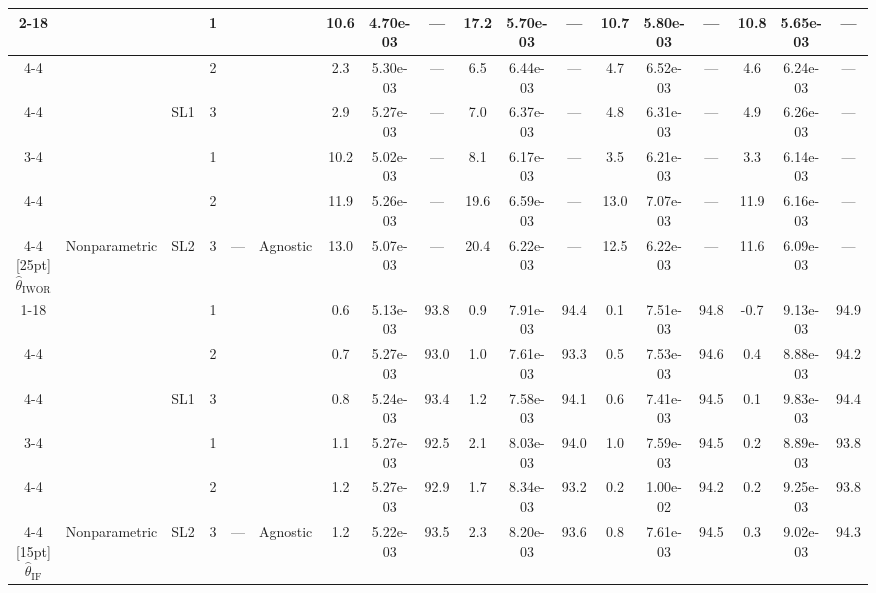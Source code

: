 \begin{table}
\begin{tabular}[t]{ccccccc@{}c@{}cc@{}c@{}cc@{}c@{}cc@{}c@{}c}
\cmidrule{2-18}
 &  &  &  1 &  &  & 10.6 & 4.70e-03 & --- & 17.2 & 5.70e-03 & --- & 10.7 & 5.80e-03 & --- & 10.8 & 5.65e-03 & ---\\
\cmidrule{4-4}
\cmidrule{7-18}
 &  &  &  2 &  &  & 2.3 & 5.30e-03 & --- & 6.5 & 6.44e-03 & --- & 4.7 & 6.52e-03 & --- & 4.6 & 6.24e-03 & ---\\
\cmidrule{4-4}
\cmidrule{7-18}
 &  & \multirow{-3}{*}[5pt]{\centering\arraybackslash SL1} &  3 &  &  & 2.9 & 5.27e-03 & --- & 7.0 & 6.37e-03 & --- & 4.8 & 6.31e-03 & --- & 4.9 & 6.26e-03 & ---\\
\cmidrule{3-4}
\cmidrule{7-18}
 &  &  &  1 &  &  & 10.2 & 5.02e-03 & --- & 8.1 & 6.17e-03 & --- & 3.5 & 6.21e-03 & --- & 3.3 & 6.14e-03 & ---\\
\cmidrule{4-4}
\cmidrule{7-18}
 &  &  &  2 &  &  & 11.9 & 5.26e-03 & --- & 19.6 & 6.59e-03 & --- & 13.0 & 7.07e-03 & --- & 11.9 & 6.16e-03 & ---\\
\cmidrule{4-4}
\cmidrule{7-18}
\multirow{-9}{*}[25pt]{\centering\arraybackslash $\widehat\theta_\text{IWOR}$} & \multirow{-6}{*}[15pt]{\centering\arraybackslash  Nonparametric} & \multirow{-3}{*}[5pt]{\centering\arraybackslash SL2} &  3 & \multirow{-6}{*}[15pt]{\centering\arraybackslash  ---} & \multirow{-6}{*}[15pt]{\centering\arraybackslash  Agnostic} & 13.0 & 5.07e-03 & --- & 20.4 & 6.22e-03 & --- & 12.5 & 6.22e-03 & --- & 11.6 & 6.09e-03 & ---\\
\cmidrule{1-18}
 &  &  &  1 &  &  & 0.6 & 5.13e-03 & 93.8 & 0.9 & 7.91e-03 & 94.4 & 0.1 & 7.51e-03 & 94.8 & -0.7 & 9.13e-03 & 94.9\\
\cmidrule{4-4}
\cmidrule{7-18}
 &  &  &  2 &  &  & 0.7 & 5.27e-03 & 93.0 & 1.0 & 7.61e-03 & 93.3 & 0.5 & 7.53e-03 & 94.6 & 0.4 & 8.88e-03 & 94.2\\
\cmidrule{4-4}
\cmidrule{7-18}
 &  & \multirow{-3}{*}[5pt]{\centering\arraybackslash SL1} &  3 &  &  & 0.8 & 5.24e-03 & 93.4 & 1.2 & 7.58e-03 & 94.1 & 0.6 & 7.41e-03 & 94.5 & 0.1 & 9.83e-03 & 94.4\\
\cmidrule{3-4}
\cmidrule{7-18}
 &  &  &  1 &  &  & 1.1 & 5.27e-03 & 92.5 & 2.1 & 8.03e-03 & 94.0 & 1.0 & 7.59e-03 & 94.5 & 0.2 & 8.89e-03 & 93.8\\
\cmidrule{4-4}
\cmidrule{7-18}
 &  &  &  2 &  &  & 1.2 & 5.27e-03 & 92.9 & 1.7 & 8.34e-03 & 93.2 & 0.2 & 1.00e-02 & 94.2 & 0.2 & 9.25e-03 & 93.8\\
\cmidrule{4-4}
\cmidrule{7-18}
\multirow{-6}{*}[15pt]{\centering\arraybackslash $\widehat\theta_\text{IF}$} & \multirow{-6}{*}[15pt]{\centering\arraybackslash  Nonparametric} & \multirow{-3}{*}[5pt]{\centering\arraybackslash SL2} &  3 & \multirow{-6}{*}[15pt]{\centering\arraybackslash  ---} & \multirow{-6}{*}[15pt]{\centering\arraybackslash  Agnostic} & 1.2 & 5.22e-03 & 93.5 & 2.3 & 8.20e-03 & 93.6 & 0.8 & 7.61e-03 & 94.5 & 0.3 & 9.02e-03 & 94.3\\

\end{tabular}
\end{table}
